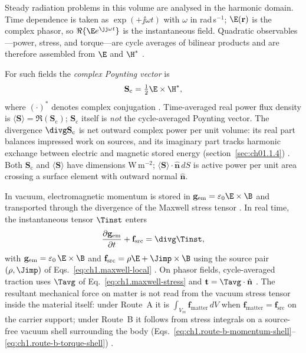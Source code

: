 Steady radiation problems in this volume are analysed in the harmonic domain. Time dependence is taken as $\exp(+\jj\omega t)$ with $\omega$ in rad\,s$^{-1}$; $\E(\mathbf{r})$ is the complex phasor, so $\Re\{\E e^{\jj\omega t}\}$ is the instantaneous field. Quadratic observables---power, stress, and torque---are cycle averages of bilinear products and are therefore assembled from $\E$ and $\H^*$ \cite{stratton1941,harrington2001}.

For such fields the \emph{complex Poynting vector} is
\begin{equation}
\label{eq:ch1.intro-poynting}
\mathbf{S}_\mathrm{c}=\tfrac{1}{2}\E\times\H^*,
\end{equation}
where $(\cdot)^*$ denotes complex conjugation \cite{poynting1884,stratton1941}.
Time-averaged real power flux density is $\langle\mathbf{S}\rangle=\Re(\mathbf{S}_\mathrm{c})$;
$\mathbf{S}_\mathrm{c}$ itself is \emph{not} the cycle-averaged Poynting vector.
The divergence $\divg\mathbf{S}_\mathrm{c}$ is net outward complex power per unit volume:
its real part balances impressed work on sources, and its imaginary part tracks harmonic
exchange between electric and magnetic stored energy (section~\ref{sec:ch01.1.4})
\cite{stratton1941}. Both $\mathbf{S}_\mathrm{c}$ and $\langle\mathbf{S}\rangle$ have
dimensions W\,m$^{-2}$; $\langle\mathbf{S}\rangle\cdot\hat{\mathbf{n}}\,dS$ is active
power per unit area crossing a surface element with outward normal $\hat{\mathbf{n}}$.

In vacuum, electromagnetic momentum is stored in $\mathbf{g}_{\mathrm{em}}=\varepsilon_0\E\times\B$ and transported through the divergence of the Maxwell stress tensor \cite{maxwell1873,stratton1941}. In real time, the instantaneous tensor $\Tinst$ enters
\begin{equation}
\label{eq:ch1.intro-momentum-balance}
\frac{\partial\mathbf{g}_{\mathrm{em}}}{\partial t}+\mathbf{f}_{\mathrm{src}}
=\divg\Tinst,
\end{equation}
with $\mathbf{g}_{\mathrm{em}}=\varepsilon_0\,\E\times\B$ and $\mathbf{f}_{\mathrm{src}}=\rho\E+\Jimp\times\B$ using the source pair $(\rho,\Jimp)$ of Eqs.~\eqref{eq:ch1.maxwell-local} \cite{maxwell1873,stratton1941}. On phasor fields, cycle-averaged traction uses $\Tavg$ of Eq.~\eqref{eq:ch1.maxwell-stress} and $\mathbf{t}=\Tavg\cdot\hat{\mathbf{n}}$ \cite{stratton1941}. The resultant mechanical force on matter is not read from the vacuum stress tensor inside the material itself: under Route~A it is $\int_{V_m}\mathbf{f}_{\mathrm{matter}}\,dV$ when $\mathbf{f}_{\mathrm{matter}}=\mathbf{f}_{\mathrm{src}}$ on the carrier support; under Route~B it follows from stress integrals on a source-free vacuum shell surrounding the body (Eqs.~\eqref{eq:ch1.route-b-momentum-shell}--\eqref{eq:ch1.route-b-torque-shell}) \cite{stratton1941,harrington2001}.

